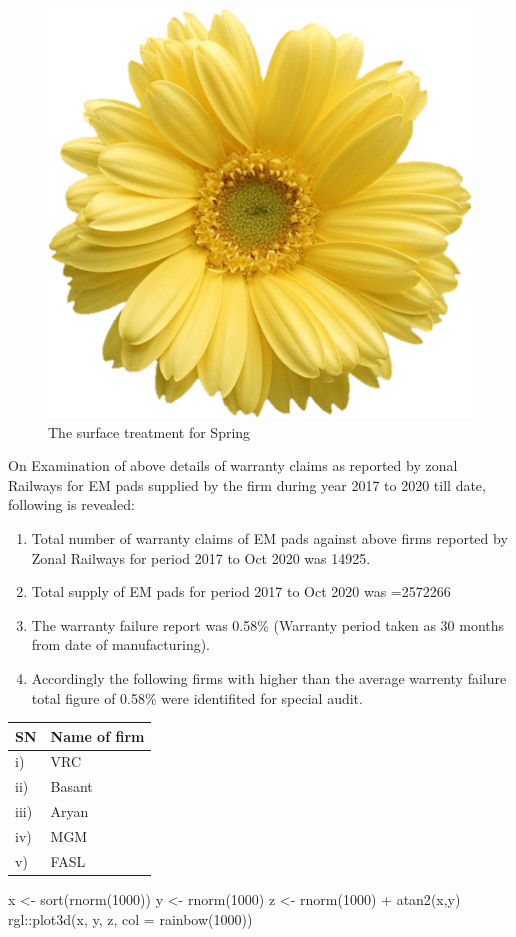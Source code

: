 \documentclass[nofonts,]{tufte-book}
\newenvironment{Shaded}{\begin{snugshade}}{\end{snugshade}}
\newcommand{\AttributeTok}[1]{\textcolor[rgb]{0.77,0.63,0.00}{#1}}
\newcommand{\DecValTok}[1]{\textcolor[rgb]{0.00,0.00,0.81}{#1}}
\newcommand{\FunctionTok}[1]{\textcolor[rgb]{0.00,0.00,0.00}{#1}}
\newcommand{\NormalTok}[1]{#1}
\newcommand{\OtherTok}[1]{\textcolor[rgb]{0.56,0.35,0.01}{#1}}
\newcommand{\SpecialCharTok}[1]{\textcolor[rgb]{0.00,0.00,0.00}{#1}}
\providecommand{\tightlist}{%
  \setlength{\itemsep}{0pt}\setlength{\parskip}{0pt}}
\begin{document}
\begin{figure}

{\centering \includegraphics[width=0.4\linewidth]{flowery} 

}

\caption[The surface treatment for Spring]{The surface treatment for Spring}\label{fig:unnamed-chunk-1}
\end{figure}

On Examination of above details of warranty claims as reported by zonal
Railways for EM pads supplied by the firm during year 2017 to 2020 till
date, following is revealed:

\begin{enumerate}
\def\labelenumi{\alph{enumi}.}
\tightlist
\item
  Total number of warranty claims of EM pads against above firms
  reported by Zonal Railways for period 2017 to Oct 2020 was 14925.
\item
  Total supply of EM pads for period 2017 to Oct 2020 was =2572266
\item
  The warranty failure report was 0.58\% (Warranty period taken as 30
  months from date of manufacturing).
\item
  Accordingly the following firms with higher than the average warrenty
  failure total figure of 0.58\% were identifited for special audit.
\end{enumerate}

\begin{longtable}[]{@{}ll@{}}
\toprule()
SN & Name of firm \\
\midrule()
\endhead
i) & VRC \\
ii) & Basant \\
iii) & Aryan \\
iv) & MGM \\
v) & FASL \\
\bottomrule()
\end{longtable}

\begin{Shaded}
\begin{Highlighting}[]
\NormalTok{x }\OtherTok{\textless{}{-}} \FunctionTok{sort}\NormalTok{(}\FunctionTok{rnorm}\NormalTok{(}\DecValTok{1000}\NormalTok{))}
\NormalTok{y }\OtherTok{\textless{}{-}} \FunctionTok{rnorm}\NormalTok{(}\DecValTok{1000}\NormalTok{)}
\NormalTok{z }\OtherTok{\textless{}{-}} \FunctionTok{rnorm}\NormalTok{(}\DecValTok{1000}\NormalTok{) }\SpecialCharTok{+} \FunctionTok{atan2}\NormalTok{(x,y)}
\NormalTok{rgl}\SpecialCharTok{::}\FunctionTok{plot3d}\NormalTok{(x, y, z, }\AttributeTok{col =} \FunctionTok{rainbow}\NormalTok{(}\DecValTok{1000}\NormalTok{))}
\end{Highlighting}
\end{Shaded}
\end{document}

